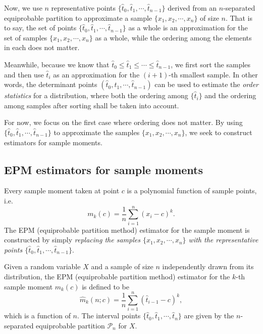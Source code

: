 Now, we use $ n $ representative points $ \{ \hat{t}_0, \hat{t}_1, \cdots, \hat{t}_{n-1} \}$ derived from an $ n $-separated equiprobable partition to approximate a sample $ \{ x_1, x_2, \cdots, x_n \} $ of size $ n $. That is to say, the set of points $ \{ \hat{t}_0, \hat{t}_1, \cdots, \hat{t}_{n-1} \} $ as a whole is an approximation for the set of samples $ \{x_1, x_2, \cdots, x_n\} $ as a whole, while the ordering among the elements in each does not matter. 

Meanwhile, because we know that $ \hat{t}_0 \leq \hat{t}_1 \leq \cdots \leq \hat{t}_{n-1} $, we first sort the samples and then use $ \hat{t}_{i} $ as an approximation for the $ (i+1) $-th smallest sample. In other words, the determinant points $ (\hat{t}_0, \hat{t}_1, \cdots, \hat{t}_{n-1}) $ can be used to estimate the \textit{order statistics} for a distribution, where both the ordering among $ \{\hat{t}_i\} $  and the ordering among samples after sorting shall be taken into account.

For now, we focus on the first case where ordering does not matter. By using $\{ \hat{t}_0, \hat{t}_1, \cdots, \hat{t}_{n-1} \}$ to approximate the samples $ \{ x_1, x_2, \cdots, x_n \} $, we seek to construct estimators for sample moments. 

\subsection{EPM estimators for sample moments}
Every sample moment taken at point $ c $ is a polynomial function of sample points, i.e.
\begin{equation}
m_{k}(c) = \frac{1}{n} \sum_{i=1}^{n} (x_i-c)^k.
\end{equation}
The EPM (equiprobable partition method) estimator for the sample moment is constructed by simply \textit{replacing the samples $ \{x_1, x_2, \cdots, x_n\} $ with the representative points $ \{ \hat{t}_0, \hat{t}_1, \cdots, \hat{t}_{n-1} \} $}.  

\begin{defn}
Given a random variable $ X $ and a sample of size $ n $ independently drawn from its distribution, the EPM (equiprobable partition method) estimator for the $ k $-th sample moment $ m_k(c) $ is defined to be
\begin{equation}
\hat{m}_k(n;c) = \frac{1}{n} \sum_{i=1}^{n} (\hat{t}_{i-1}-c)^k,
\end{equation}
which is a function of $ n $. The interval points $ \{ \hat{t}_0, \hat{t}_1, \cdots, \hat{t}_{n} \} $ are given by the $ n $-separated equiprobable partition $ \mathcal{P}_n $ for $ X $. 
\end{defn}

